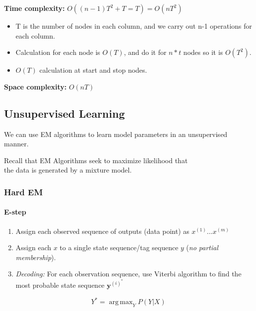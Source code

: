 \documentclass[a4paper]{article}
\DeclareMathOperator*{\argmax}{arg\,max}
\begin{document}
\noindent\textbf{Time complexity:} $O((n-1)T^2+T=T) = O(nT^2)$

\begin{itemize}
	\item T is the number of nodes in each column, and we carry out n-1 operations for each column.
	\item Calculation for each node is $O(T)$, and do it for $n*t$ nodes so it is $O(T^2)$.
	\item $O(T)$ calculation at start and stop nodes.
\end{itemize}

\noindent\textbf{Space complexity:} $O(nT)$

\subsection{Unsupervised Learning}
We can use EM algorithms to learn model parameters in an unsupervised manner.

\begin{framed}
	\begin{displayquote}
		\begin{center}
			Recall that EM Algorithms seek to maximize likelihood that\\ the data is generated by a mixture model.
		\end{center}
	\end{displayquote}
\end{framed}

\subsubsection{Hard EM}

\paragraph{E-step}

\begin{enumerate}
	\item Assign each observed sequence of outputs (data point) as $x^{(1)}...x^{(m)}$
	\item Assign each $x$ to a single state sequence/tag sequence $y$ (\textit{no partial membership}).
	\item \textit{Decoding:} For each observation sequence, use Viterbi algorithm to find the most probable state sequence $\textbf{y}^{(i)^*}$
\end{enumerate}
$$ Y^* =\argmax_Y P(Y|X) $$
\end{document}
